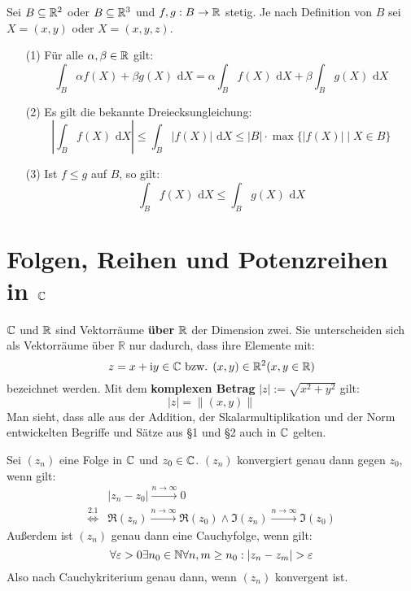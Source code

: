 \documentclass[a4paper,twoside,DIV15,BCOR12mm,chapterprefix=true,headings=twolinechapter]{scrbook}
\begin{document}
\begin{enumerate}
\begin{satz}
Sei $B\subseteq\mathbb{R}^2$ oder $B\subseteq\mathbb{R}^3$ und $f,g:B\to\mathbb{R}$ stetig.
Je nach Definition von $B$ sei $X=(x,y)$ oder $X=(x,y,z)$.
\begin{enumerate}
\item[(1)] Für alle $\alpha,\beta\in\mathbb{R}$ gilt:
\[\int_B \alpha f(X)+\beta g(X)\text{ d}X=\alpha\int_B f(X)\text{ d}X+\beta\int_B g(X)\text{ d}X\]
\item[(2)] Es gilt die bekannte Dreiecksungleichung:
\[|\int_B f(X)\text{ d}X|\le \int_B |f(X)| \text{ d}X\le |B|\cdot \max\{|f(X)|\mid X\in B\}\]
\item[(3)] Ist $f\le g$ auf $B$, so gilt:
\[\int_B f(X)\text{ d}X \le \int_B g(X)\text{ d}X\]
\end{enumerate}
\end{satz}
\end{enumerate}

\chapter{Folgen, Reihen und Potenzreihen in $\mathbb{C}$}
\renewcommand{\labelenumi}{(\arabic{enumi})}

$\mathbb{C}$ und $\mathbb{R}$ sind Vektorräume \textbf{über $\mathbb{R}$} der Dimension zwei.
Sie unterscheiden sich als Vektorräume über $\mathbb{R}$ nur dadurch, dass ihre Elemente
mit:
\[z=x+\text{i} y\in \mathbb{C} \text { bzw. }(x,y)\in\mathbb{R}^2 (x,y\in\mathbb{R})\]
bezeichnet werden. Mit dem \textbf{komplexen Betrag} $|z|:=\sqrt{x^2+y^2}$ gilt:
\[|z|=\|(x,y)\|\]
Man sieht, dass alle aus der Addition, der Skalarmultiplikation und der Norm entwickelten Begriffe
und Sätze aus §1 und §2 auch in $\mathbb{C}$ gelten.
\\
\begin{beispiel}
Sei $(z_n)$ eine Folge in $\mathbb{C}$ und $z_0\in\mathbb{C}$. $(z_n)$ konvergiert genau dann gegen
$z_0$, wenn gilt:
\begin{align*}
&|z_n-z_0|\stackrel{n\to\infty}{\to}0\\
\stackrel{2.1}{\iff} &\Re(z_n)\stackrel{n\to\infty}{\to}\Re(z_0)\wedge
\Im(z_n)\stackrel{n\to\infty}{\to}\Im(z_0)
\end{align*}
Außerdem ist $(z_n)$ genau dann eine Cauchyfolge, wenn gilt:
\[\forall\ep>0\exists n_0\in\MdN\forall n,m\ge n_0: |z_n-z_m|>\ep\]
Also nach Cauchykriterium genau dann, wenn $(z_n)$ konvergent ist.
\end{beispiel}
\end{document}
